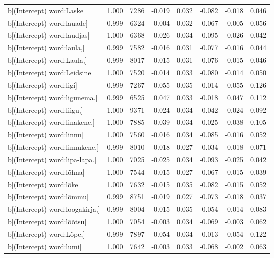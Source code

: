 \begin{longtable}{lrrrrrrr}
  b[(Intercept) word:Laske] & 1.000 & 7286 & -0.019 & 0.032 & -0.082 & -0.018 & 0.046 \\ 
  b[(Intercept) word:lauade] & 0.999 & 6324 & -0.004 & 0.032 & -0.067 & -0.005 & 0.056 \\ 
  b[(Intercept) word:laudjas] & 1.000 & 6368 & -0.026 & 0.034 & -0.095 & -0.026 & 0.042 \\ 
  b[(Intercept) word:laula,] & 0.999 & 7582 & -0.016 & 0.031 & -0.077 & -0.016 & 0.044 \\ 
  b[(Intercept) word:Laula,] & 0.999 & 8017 & -0.015 & 0.031 & -0.076 & -0.015 & 0.046 \\ 
  b[(Intercept) word:Leidsine] & 1.000 & 7520 & -0.014 & 0.033 & -0.080 & -0.014 & 0.050 \\ 
  b[(Intercept) word:ligi] & 0.999 & 7267 & 0.055 & 0.035 & -0.014 & 0.055 & 0.126 \\ 
  b[(Intercept) word:ligunema.] & 0.999 & 6525 & 0.047 & 0.033 & -0.018 & 0.047 & 0.112 \\ 
  b[(Intercept) word:liigu,] & 1.000 & 9371 & 0.024 & 0.034 & -0.042 & 0.024 & 0.092 \\ 
  b[(Intercept) word:linakene,] & 1.000 & 7885 & 0.039 & 0.034 & -0.025 & 0.038 & 0.105 \\ 
  b[(Intercept) word:linnu] & 1.000 & 7560 & -0.016 & 0.034 & -0.085 & -0.016 & 0.052 \\ 
  b[(Intercept) word:linnukene,] & 0.999 & 8010 & 0.018 & 0.027 & -0.034 & 0.018 & 0.071 \\ 
  b[(Intercept) word:lipa-lapa.] & 1.000 & 7025 & -0.025 & 0.034 & -0.093 & -0.025 & 0.042 \\ 
  b[(Intercept) word:lõhna] & 1.000 & 7544 & -0.015 & 0.027 & -0.067 & -0.015 & 0.039 \\ 
  b[(Intercept) word:lõke] & 1.000 & 7632 & -0.015 & 0.035 & -0.082 & -0.015 & 0.052 \\ 
  b[(Intercept) word:lõmmu] & 0.999 & 8751 & -0.019 & 0.027 & -0.073 & -0.018 & 0.037 \\ 
  b[(Intercept) word:loogakirja,] & 0.999 & 8004 & 0.015 & 0.035 & -0.054 & 0.014 & 0.083 \\ 
  b[(Intercept) word:lõõtsu] & 1.000 & 7054 & -0.003 & 0.034 & -0.069 & -0.003 & 0.062 \\ 
  b[(Intercept) word:Lõpe,] & 0.999 & 7897 & 0.054 & 0.034 & -0.013 & 0.054 & 0.122 \\ 
  b[(Intercept) word:lumi] & 1.000 & 7642 & -0.003 & 0.033 & -0.068 & -0.002 & 0.063 \\ 

\end{longtable}
